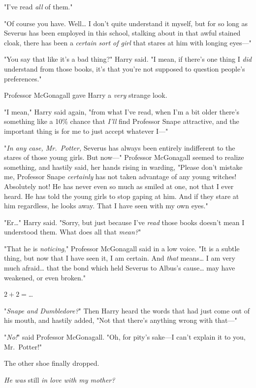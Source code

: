"I've read \emph{all} of them."

"Of course you have. Well{\ldots} I don't quite understand it myself, but for
so long as Severus has been employed in this school, stalking about in that
awful stained cloak, there has been a \emph{certain sort of girl} that stares
at him with longing eyes---"

"You say that like it's a bad thing?" Harry said. "I mean, if there's one thing
I \emph{did} understand from those books, it's that you're not supposed to
question people's preferences."

Professor McGonagall gave Harry a \emph{very} strange look.

"I mean," Harry said again, "from what I've read, when I'm a bit older there's
something like a 10\% chance that \emph{I'll} find Professor Snape attractive,
and the important thing is for me to just accept whatever I---"

"\emph{In any case, Mr.~Potter,} Severus has always been entirely indifferent
to the stares of those young girls. But now---" Professor McGonagall seemed to
realize something, and hastily said, her hands rising in warding, "Please don't
mistake me, Professor Snape \emph{certainly} has not taken advantage of any
young witches! Absolutely not! He has never even so much as smiled at one, not
that I ever heard. He has told the young girls to stop gaping at him. And if
they stare at him regardless, he looks away. That I have seen with my own eyes."

"Er{\ldots}" Harry said. "Sorry, but just because I've \emph{read} those books
doesn't mean I understood them. What does all that \emph{mean?}"

"That he is \emph{noticing}," Professor McGonagall said in a low voice. "It is
a subtle thing, but now that I have seen it, I am certain. And \emph{that}
means{\ldots} I am very much afraid{\ldots} that the bond which held Severus to
Albus's cause{\ldots} may have weakened, or even broken."

$2 + 2 = ${\ldots}

"\emph{Snape and Dumbledore?}" Then Harry heard the words that had just come
out of his mouth, and hastily added, "Not that there's anything wrong with
that---"

"\emph{No!}" said Professor McGonagall. "Oh, for pity's sake---I can't explain
it to you, Mr.~Potter!"

The other shoe finally dropped.

\emph{He was} still \emph{in love with my mother?}

